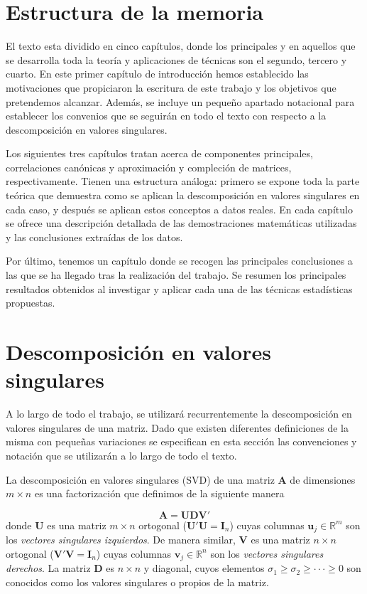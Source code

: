 \documentclass[tfg,cienciasbased,lot,lof,covers,final,overleaf,nocopyright]{tfgtfmthesisuam}
\begin{document}
\section{Estructura de la memoria}
El texto esta dividido en cinco capítulos, donde los principales y en aquellos que se desarrolla toda la teoría y aplicaciones de técnicas son el segundo, tercero y cuarto. En este primer capítulo de introducción hemos establecido las motivaciones que propiciaron la escritura de este trabajo y los objetivos que pretendemos alcanzar. Además, se incluye un pequeño apartado notacional para establecer los convenios que se seguirán en todo el texto con respecto a la descomposición en valores singulares.

Los siguientes tres capítulos tratan acerca de componentes principales, correlaciones canónicas y aproximación y compleción de matrices, respectivamente. Tienen una estructura análoga: primero se expone toda la parte teórica que demuestra como se aplican la descomposición en valores singulares en cada caso, y después se aplican estos conceptos a datos reales. En cada capítulo se ofrece una descripción detallada de las demostraciones matemáticas utilizadas y las conclusiones extraídas de los datos.

Por último, tenemos un capítulo donde se recogen las principales conclusiones a las que se ha llegado tras la realización del trabajo. Se resumen los principales resultados obtenidos al investigar y aplicar cada una de las técnicas estadísticas propuestas.


\section{Descomposición en valores singulares}
\label{sec:not_SVD}
A lo largo de todo el trabajo, se utilizará recurrentemente la descomposición en valores singulares de una matriz. Dado que existen diferentes definiciones de la misma con pequeñas variaciones se especifican en esta sección las convenciones y notación que se utilizarán a lo largo de todo el texto.

La descomposición en valores singulares (SVD) de una matriz $\mathbf{A}$ de dimensiones $m \times n$ es una factorización que definimos de la siguiente manera 

$$\mathbf{A}=\mathbf{UDV}'$$ 
donde $\mathbf{U}$ es una matriz $m \times n$ ortogonal ($\mathbf{U}'\mathbf{U}=\mathbf{I}_n$) cuyas columnas $\mathbf{u}_j \in \mathbb{R}^m$ son los \textit{vectores singulares izquierdos}. De manera similar, $\mathbf{V}$ es una matriz $n \times n$ ortogonal ($\mathbf{V}'\mathbf{V}=\mathbf{I}_n$) cuyas columnas $\mathbf{v}_j \in \mathbb{R}^n$ son los \textit{vectores singulares derechos}. La matriz $\mathbf{D}$ es $n \times n$ y diagonal, cuyos elementos $\sigma_1 \geq \sigma_2 \geq \cdot \cdot \cdot \geq 0$ son conocidos como los valores singulares o propios de la matriz. 
\end{document}
